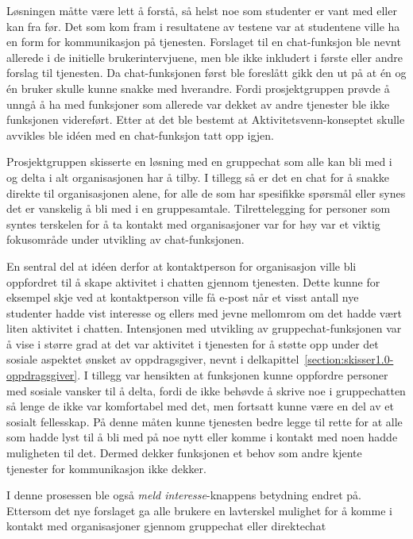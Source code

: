 Løsningen måtte være lett å forstå, så helst noe som studenter er vant med eller kan fra før. Det som kom fram i resultatene av testene var at studentene ville ha en form for kommunikasjon på tjenesten. Forslaget til en chat-funksjon ble nevnt allerede i de initielle brukerintervjuene, men ble ikke inkludert i første eller andre forslag til tjenesten. Da chat-funksjonen først ble foreslått gikk den ut på at én og én bruker skulle kunne snakke med hverandre. Fordi prosjektgruppen prøvde å unngå å ha med funksjoner som allerede var dekket av andre tjenester ble ikke funksjonen videreført. Etter at det ble bestemt at Aktivitetsvenn-konseptet skulle avvikles ble idéen med en chat-funksjon tatt opp igjen.

Prosjektgruppen skisserte en løsning med en gruppechat som alle kan bli med i og delta i alt organisasjonen har å tilby. I tillegg så er det en chat for å snakke direkte til organisasjonen alene, for alle de som har spesifikke spørsmål eller synes det er vanskelig å bli med i en gruppesamtale. Tilrettelegging for personer som syntes terskelen for å ta kontakt med organisasjoner var for høy var et viktig fokusområde under utvikling av chat-funksjonen. 

En sentral del at idéen derfor at kontaktperson for organisasjon ville bli oppfordret til å skape aktivitet i chatten gjennom tjenesten. Dette kunne for eksempel skje ved at kontaktperson ville få e-post når et visst antall nye studenter hadde vist interesse og ellers med jevne mellomrom om det hadde vært liten aktivitet i chatten. Intensjonen med utvikling av gruppechat-funksjonen var å vise i større grad at det var aktivitet i tjenesten for å støtte opp under det sosiale aspektet ønsket av oppdragsgiver, nevnt i delkapittel~\ref{section:skisser1.0-oppdragsgiver}. I tillegg var hensikten at funksjonen kunne oppfordre personer med sosiale vansker til å delta, fordi de ikke behøvde å skrive noe i gruppechatten så lenge de ikke var komfortabel med det, men fortsatt kunne være en del av et sosialt fellesskap. På denne måten kunne tjenesten bedre legge til rette for at alle som hadde lyst til å bli med på noe nytt eller komme i kontakt med noen hadde muligheten til det. Dermed dekker funksjonen et behov som andre kjente tjenester for kommunikasjon ikke dekker.

I denne prosessen ble også {\em  meld interesse}-knappens betydning endret på. Ettersom det nye forslaget ga alle brukere en lavterskel mulighet for å komme i kontakt med organisasjoner gjennom gruppechat eller direktechat

